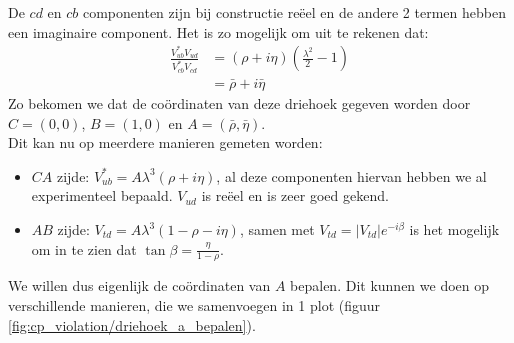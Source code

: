 \documentclass[../main.tex]{subfiles}
\begin{document}
De $cd$ en $cb$ componenten zijn bij constructie reëel en de andere 2 termen hebben een imaginaire component. Het is zo mogelijk om uit te rekenen dat:
\begin{equation}
    \begin{aligned}
        \label{eq:driehoeksvoorstelling_mat_vermenigvuldiging}
        \frac{V_{u b}^{*} V_{u d}}{V_{c b}^{*} V_{c d}} &=(\rho+i \eta)\left(\frac{\lambda^{2}}{2}-1\right) \\
                                                        &=\bar{\rho}+i \bar{\eta}
    \end{aligned}
\end{equation}
Zo bekomen we dat de coördinaten van deze driehoek gegeven worden door $C=(0,0)$, $B=(1,0)$ en $A=(\bar{\rho}, \bar{\eta})$.\\
Dit kan nu op meerdere manieren gemeten worden:
\begin{itemize}
    \item $CA$ zijde: $V_{u b}^{*}=A \lambda^{3}(\rho+i \eta)$, al deze componenten hiervan hebben we al experimenteel bepaald. $V_{ud}$ is reëel en is zeer goed gekend.
    \item $AB$ zijde: $V_{t d}=A \lambda^{3}(1-\rho-i \eta)$, samen met $V_{t d}=\left|V_{t d}\right| e^{-i \beta}$ is het mogelijk om in te zien dat $\tan \beta=\frac{\eta}{1-\rho}$.
\end{itemize}
We willen dus eigenlijk de coördinaten van $A$ bepalen. Dit kunnen we doen op verschillende manieren, die we samenvoegen in 1 plot (figuur \ref{fig:cp_violation/driehoek_a_bepalen}).
\end{document}
